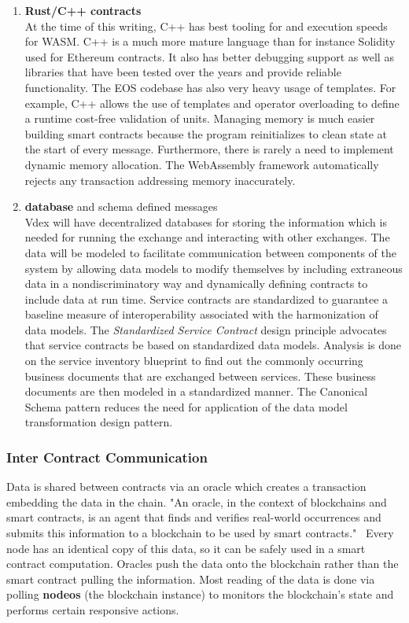 \documentclass[]{article}
\begin{document}
{\begin{enumerate}
	\item \textbf{Rust/C++ contracts\\}
	At the time of this writing,
	C++ has best tooling for and execution speeds for WASM.
	C++ is a much more mature language than for instance Solidity used for Ethereum contracts.
	It also has better debugging support as well as libraries that have been tested over the years and provide reliable functionality. 
	The EOS codebase has also very heavy usage of templates.
	For example, C++ allows the use of templates and operator overloading to define a runtime cost-free validation of units.
	Managing memory is much easier building smart contracts because the program reinitializes to clean state at the start of every message. 
	Furthermore, there is rarely a need to implement dynamic memory allocation. 
	The WebAssembly framework automatically rejects any transaction addressing memory inaccurately.
	
	\item \textbf{database} and schema defined messages\\
	
	Vdex will have decentralized databases for storing the information which is needed for running the exchange and interacting with other exchanges.
	The data will be modeled to facilitate communication between components of the system by allowing data models to modify themselves by including extraneous data in a nondiscriminatory way and dynamically defining contracts to include data at run time. 
	Service contracts are standardized to guarantee a baseline measure of interoperability associated with the harmonization of data models.
	The \textit{Standardized Service Contract} design principle advocates that service contracts be based on standardized data models. 
	Analysis is done on the service inventory blueprint to find out the commonly occurring business documents that are exchanged between services. 
	These business documents are then modeled in a standardized manner. 
	The Canonical Schema pattern reduces the need for application of the data model transformation design pattern.
	\cite{1}
	
		
\end{enumerate}
	 
	\subsubsection{Inter Contract Communication}
	Data is shared between contracts via an oracle which creates a transaction embedding the data in the chain. "An oracle, in the context of blockchains and smart contracts, is an agent that finds and verifies real-world occurrences and submits this information to a blockchain to be used by smart contracts."\ 
	\cite{2}
	Every node has an identical copy of this data, so it can be safely used in a smart contract computation.
	Oracles push the data onto the blockchain rather than the smart contract pulling the information.
	Most reading of the data is done via polling \textbf{nodeos} (the blockchain instance) to monitors the blockchain's state and performs certain responsive actions. 
	
}
\end{document}
